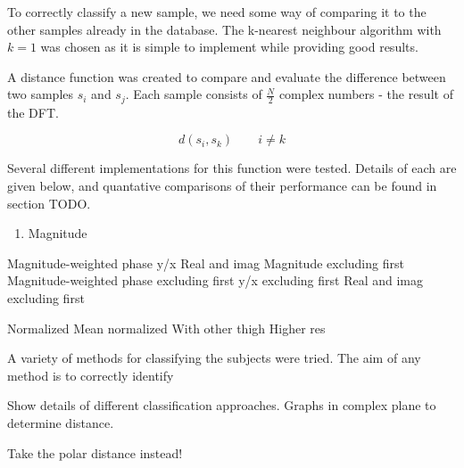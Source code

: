 To correctly classify a new sample, we need some way of comparing it to the other samples already in the database.
The k-nearest neighbour algorithm with $k=1$ was chosen as it is simple to implement while providing good results.

A distance function was created to compare and evaluate the difference between two samples $s_i$ and $s_j$.
Each sample consists of $\frac{N}{2}$ complex numbers - the result of the DFT.

\begin{equation}
	d(s_i, s_k) \quad \quad i \neq k
\end{equation}

Several different implementations for this function were tested.
Details of each are given below, and quantative comparisons of their performance can be found in section TODO.

\begin{enumerate}
	\item Magnitude
\end{enumerate}




Magnitude-weighted phase
y/x
Real and imag
Magnitude excluding first
Magnitude-weighted phase excluding first
y/x excluding first
Real and imag excluding first

Normalized
Mean normalized
With other thigh
Higher res

A variety of methods for classifying the subjects were tried.
The aim of any method is to correctly identify 


Show details of different classification approaches.
Graphs in complex plane to determine distance.

Take the polar distance instead!
